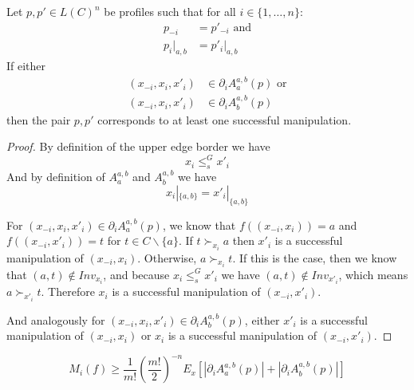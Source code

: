 	\begin{lemma}
		\label{manipulation-per-edge-in-a}
		Let $p, p' \in L(C)^n$ be profiles such that for all $i \in \{1, \ldots, n\}$:
		\begin{align*}
			p_{-i} &= p'_{-i} \textrm{ and} \\
			p_i|_{a,b} &= p'_i|_{a,b}
		\end{align*}
		If either
		\begin{align*}
			(x_{-i}, x_i, x'_i) &\in \partial_i A^{a,b}_a(p) \textrm{ or} \\
			(x_{-i}, x_i, x'_i) &\in \partial_i A^{a,b}_b(p)
		\end{align*}
		then the pair $p, p'$ corresponds to at least one successful manipulation.
	\end{lemma}

	\begin{proof}
		By definition of the upper edge border we have
		\[
			x_i \le^G_s x'_i
		\]
		And by definition of $A^{a,b}_a$ and $A^{a,b}_b$ we have
		\[
			x_i|_{\{a,b\}} = x'_i|_{\{a,b\}}
		\]

		For $(x_{-i}, x_i, x'_i) \in \partial_i A^{a,b}_a(p)$, we know that $f((x_{-i}, x_i)) = a$ and $f((x_{-i}, x'_i)) = t$ for $t \in C \backslash \{a\}$. If $t \succ_{x_i} a$ then $x'_i$ is a successful manipulation of $(x_{-i}, x_i)$. Otherwise, $a \succ_{x_i} t$. If this is the case, then we know that $(a, t) \notin Inv_{x_i}$, and because $x_i \le^G_s x'_i$ we have $(a, t) \notin Inv_{x'_i}$, which means $a \succ_{x'_i} t$. Therefore $x_i$ is a successful manipulation of $(x_{-i}, x'_i)$.

		And analogously for $(x_{-i}, x_i, x'_i) \in \partial_i A^{a,b}_b(p)$, either $x'_i$ is a successful manipulation of $(x_{-i}, x_i)$ or $x_i$ is a successful manipulation of $(x_{-i}, x'_i)$.
	\end{proof}

	\begin{lemma}
		\[
			M_i(f) \ge \frac{1}{m!} \left(\frac{m!}{2}\right)^{-n} E_x \left[|\partial_i A^{a,b}_a(p)| + |\partial_i A^{a,b}_b(p)| \right]
		\]
	\end{lemma}

